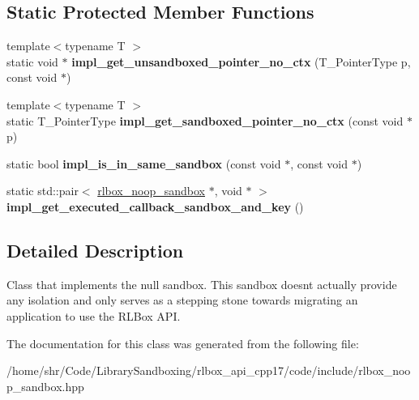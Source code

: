 \subsection*{Static Protected Member Functions}
\begin{DoxyCompactItemize}
\item 
\mbox{\label{classrlbox_1_1rlbox__noop__sandbox_afae688a22b4d5e7f83dca0bf7fa41d9a}} 
{\footnotesize template$<$typename T $>$ }\\static void $\ast$ {\bfseries impl\+\_\+get\+\_\+unsandboxed\+\_\+pointer\+\_\+no\+\_\+ctx} (T\+\_\+\+Pointer\+Type p, const void $\ast$)
\item 
\mbox{\label{classrlbox_1_1rlbox__noop__sandbox_aaa067f45504c3f37642d202562dbaa30}} 
{\footnotesize template$<$typename T $>$ }\\static T\+\_\+\+Pointer\+Type {\bfseries impl\+\_\+get\+\_\+sandboxed\+\_\+pointer\+\_\+no\+\_\+ctx} (const void $\ast$p)
\item 
\mbox{\label{classrlbox_1_1rlbox__noop__sandbox_a5f720e5813f800fe573b028ce363760a}} 
static bool {\bfseries impl\+\_\+is\+\_\+in\+\_\+same\+\_\+sandbox} (const void $\ast$, const void $\ast$)
\item 
\mbox{\label{classrlbox_1_1rlbox__noop__sandbox_a4166590503035668cd74a63755cd1167}} 
static std\+::pair$<$ \hyperlink{classrlbox_1_1rlbox__noop__sandbox}{rlbox\+\_\+noop\+\_\+sandbox} $\ast$, void $\ast$ $>$ {\bfseries impl\+\_\+get\+\_\+executed\+\_\+callback\+\_\+sandbox\+\_\+and\+\_\+key} ()
\end{DoxyCompactItemize}


\subsection{Detailed Description}
Class that implements the null sandbox. This sandbox doesn\textquotesingle{}t actually provide any isolation and only serves as a stepping stone towards migrating an application to use the R\+L\+Box A\+PI. 

The documentation for this class was generated from the following file\+:\begin{DoxyCompactItemize}
\item 
/home/shr/\+Code/\+Library\+Sandboxing/rlbox\+\_\+api\+\_\+cpp17/code/include/rlbox\+\_\+noop\+\_\+sandbox.\+hpp\end{DoxyCompactItemize}
